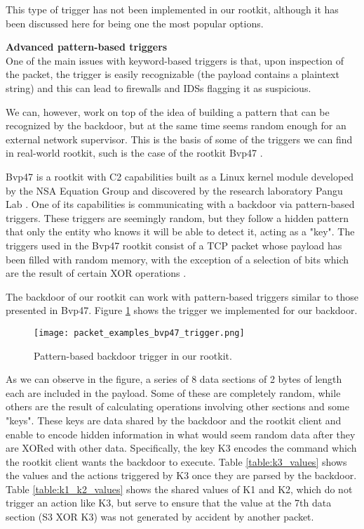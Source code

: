 This type of trigger has not been implemented in our rootkit, although it has been discussed here for being one the most popular options.

\textbf{Advanced pattern-based triggers}\\
One of the main issues with keyword-based triggers is that, upon inspection of the packet, the trigger is easily recognizable (the payload contains a plaintext string) and this can lead to firewalls and IDSs flagging it as suspicious. 

We can, however, work on top of the idea of building a pattern that can be recognized by the backdoor, but at the same time seems random enough for an external network supervisor. This is the basis of some of the triggers we can find in real-world rootkit, such is the case of the rootkit Bvp47 \cite{bvp47_report}. %

Bvp47 is a rootkit with C2 capabilities built as a Linux kernel module developed by the NSA Equation Group and discovered by the research laboratory Pangu Lab \cite{pangu_lab}. One of its capabilities is communicating with a backdoor via pattern-based triggers. These triggers are seemingly random, but they follow a hidden pattern that only the entity who knows it will be able to detect it, acting as a "key". The triggers used in the Bvp47 rootkit consist of a TCP packet whose payload has been filled with random memory, with the exception of a selection of bits which are the result of certain XOR operations \cite{bvp47_report_p49}.

The backdoor of our rootkit can work with pattern-based triggers similar to those presented in Bvp47. Figure \ref{fig:bvp47_trigger} shows the trigger we implemented for our backdoor.

\begin{figure}[htbp]
	\centering
	\texttt{[image: packet\_examples\_bvp47\_trigger.png]}
	\caption{Pattern-based backdoor trigger in our rootkit.}
	\label{fig:bvp47_trigger}
\end{figure}

As we can observe in the figure, a series of 8 data sections of 2 bytes of length each are included in the payload. Some of these are completely random, while others are the result of calculating operations involving other sections and some "keys". These keys are data shared by the backdoor and the rootkit client and enable to encode hidden information in what would seem random data after they are XORed with other data. Specifically, the key K3 encodes the command which the rootkit client wants the backdoor to execute. Table \ref{table:k3_values} shows the values and the actions triggered by K3 once they are parsed by the backdoor. Table \ref{table:k1_k2_values} shows the shared values of K1 and K2, which do not trigger an action like K3, but serve to ensure that the value at the 7th data section (S3 XOR K3) was not generated by accident by another packet.

